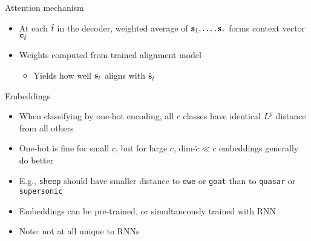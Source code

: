 \begin{frame}{Attention mechanism}
    \begin{center}
        
    \end{center}

    \begin{itemize}
        \item At each $\hat{t}$ in the decoder, weighted average of $\mathbf{s}_1, \dots, \mathbf{s}_\tau$ forms context vector $\mathbf{c}_{\hat{t}}$
        \item Weights computed from trained alignment model
        \begin{itemize}
            \item Yields how well $\mathbf{s}_t$ \alert{aligns} with $\hat{\mathbf{s}}_{\hat{t}}$
        \end{itemize}
    \end{itemize}
\end{frame}

\begin{frame}{Embeddings}
    \begin{itemize}
        \item When classifying by one-hot encoding, all $c$ classes have identical $L^p$ distance from all others
        \item One-hot is fine for small $c$, but for large $c$, dim-$\tilde{c} \ll c$ \textcolor{Green4}{embeddings} generally do better
        \item E.g., \texttt{sheep} should have smaller distance to \texttt{ewe} or \texttt{goat} than to \texttt{quasar} or \texttt{supersonic}
        \item \textcolor{Green4}{Embeddings} can be pre-trained, or simultaneously trained with RNN
        \item Note: not at all unique to RNNs
    \end{itemize}

    \centering
    
\end{frame}

